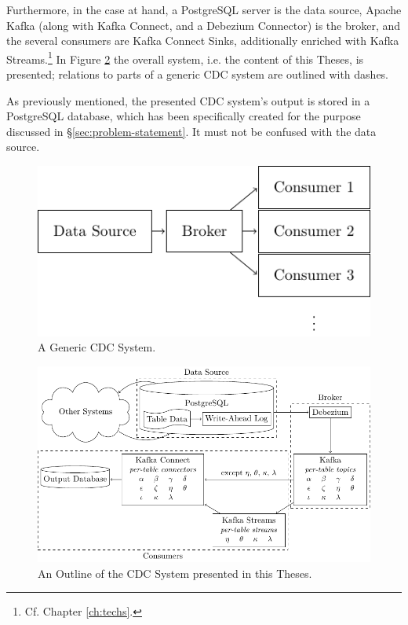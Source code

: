 Furthermore, in the case at hand, a PostgreSQL server is the data source, Apache Kafka (along with Kafka Connect, and a Debezium Connector) is the broker, and the several consumers are Kafka Connect Sinks, additionally enriched with Kafka Streams.\footnote{Cf. Chapter \ref{ch:techs}.}
In Figure \ref{fig:cdc-complete} the overall system, i.e. the content of this Theses, is presented; relations to parts of a generic CDC system are outlined with dashes.

As previously mentioned, the presented CDC system's output is stored in a PostgreSQL database, which has been specifically created for the purpose discussed in \S \ref{sec:problem-statement}.
It must not be confused with the data source.

\begin{figure}
\centering
\includegraphics[]{figures/introduction/cdc-generic}
\caption{A Generic CDC System.}
\label{fig:cdc-generic}
\end{figure}

\begin{figure}
\centering
\includegraphics[width=\linewidth]{figures/introduction/cdc-complete}
\caption{An Outline of the CDC System presented in this Theses.}
\label{fig:cdc-complete}
\end{figure}



